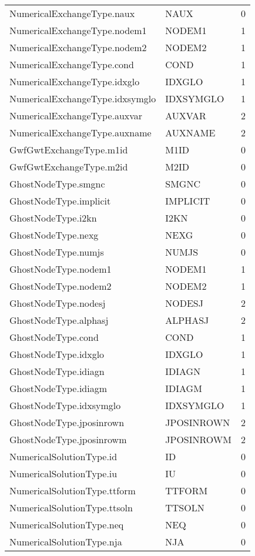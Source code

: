 \begin{longtable}{p{6cm} p{4cm} p{2cm} }
NumericalExchangeType.naux &  NAUX & 0 \\ 
NumericalExchangeType.nodem1 &  NODEM1 & 1 \\ 
NumericalExchangeType.nodem2 &  NODEM2 & 1 \\ 
NumericalExchangeType.cond &  COND & 1 \\ 
NumericalExchangeType.idxglo &  IDXGLO & 1 \\ 
NumericalExchangeType.idxsymglo &  IDXSYMGLO & 1 \\ 
NumericalExchangeType.auxvar &  AUXVAR & 2 \\ 
NumericalExchangeType.auxname & AUXNAME & 2 \\ 
GwfGwtExchangeType.m1id &  M1ID & 0 \\ 
GwfGwtExchangeType.m2id &  M2ID & 0 \\ 
GhostNodeType.smgnc &  SMGNC & 0 \\ 
GhostNodeType.implicit &  IMPLICIT & 0 \\ 
GhostNodeType.i2kn &  I2KN & 0 \\ 
GhostNodeType.nexg &  NEXG & 0 \\ 
GhostNodeType.numjs &  NUMJS & 0 \\ 
GhostNodeType.nodem1 &  NODEM1 & 1 \\ 
GhostNodeType.nodem2 &  NODEM2 & 1 \\ 
GhostNodeType.nodesj &  NODESJ & 2 \\ 
GhostNodeType.alphasj &  ALPHASJ & 2 \\ 
GhostNodeType.cond &  COND & 1 \\ 
GhostNodeType.idxglo &  IDXGLO & 1 \\ 
GhostNodeType.idiagn &  IDIAGN & 1 \\ 
GhostNodeType.idiagm &  IDIAGM & 1 \\ 
GhostNodeType.idxsymglo &  IDXSYMGLO & 1 \\ 
GhostNodeType.jposinrown &  JPOSINROWN & 2 \\ 
GhostNodeType.jposinrowm &  JPOSINROWM & 2 \\ 
NumericalSolutionType.id &  ID & 0 \\ 
NumericalSolutionType.iu &  IU & 0 \\ 
NumericalSolutionType.ttform &  TTFORM & 0 \\ 
NumericalSolutionType.ttsoln &  TTSOLN & 0 \\ 
NumericalSolutionType.neq &  NEQ & 0 \\ 
NumericalSolutionType.nja &  NJA & 0 \\ 

\end{longtable}
